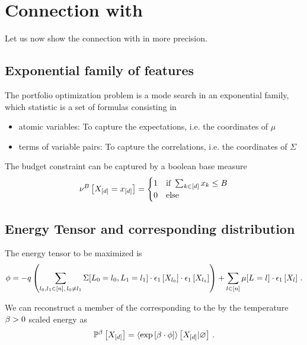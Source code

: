 \documentclass[aps,onecolumn,nofootinbib,pra]{article}
\begin{document}
    \section{Connection with \tnreason}

    Let us now show the connection with \tnreason in more precision.

    \subsection{Exponential family of features}

    The portfolio optimization problem is a mode search in an exponential family, which statistic is a set of formulas consisting in
    \begin{itemize}
        \item atomic variables: To capture the expectations, i.e. the coordinates of $\mu$
        \item terms of variable pairs: To capture the correlations, i.e. the coordinates of $\Sigma$
    \end{itemize}

    The budget constraint can be captured by a boolean base measure
    \begin{align*}
        \nu^{B}\left[X_{[d]}=x_{[d]}\right]
        =\begin{cases}
             1 & \text{if } \sum_{k\in[d]}x_{k} \leq B \\
             0 & \text{else}
        \end{cases}
    \end{align*}

    \subsection{Energy Tensor and corresponding distribution}

    The energy tensor to be maximized is
    \[ \phi = - q \left(\sum_{l_{0},l_{1}\in[n] , \, l_{0}\neq l_{1}}
    \Sigma[L_{0}=l_{0},L_{1}=l_{1}] \cdot \epsilon_{1}\left[X_{l_{0}}\right]\cdot \epsilon_{1}\left[X_{l_{1}}\right]\right)
    + \sum_{l\in[n]} \mu[L_{}=l_{}] \cdot \epsilon_{1}\left[X_{l}\right] \, . \]

    We can reconstruct a member of the corresponding \MarkovLogicNetwork{} to the by the temperature $\beta>0$ scaled energy as
    \begin{align*}
        \mathbb{P}^{\beta}\left[X_{[d]}\right] = \left\langle \mathrm{exp}\left[\beta\cdot\phi\right]\right\rangle \left[ X_{[d]} | \varnothing \right] \, .
    \end{align*}
\end{document}

